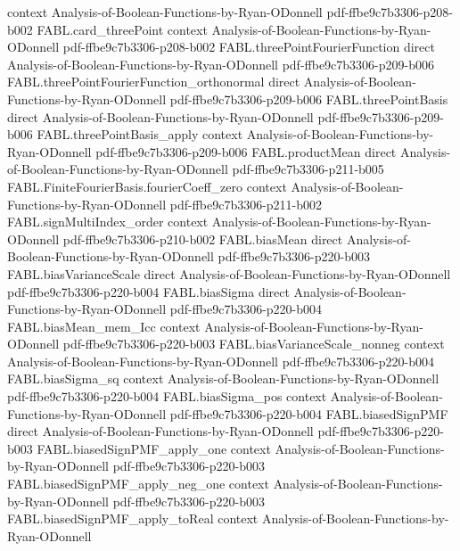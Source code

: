 \begin{theorem}
  {context}
  {Analysis-of-Boolean-Functions-by-Ryan-ODonnell}
  {pdf-ffbe9c7b3306-p208-b002}
\proofstep
  {FABL.card_threePoint}
  {context}
  {Analysis-of-Boolean-Functions-by-Ryan-ODonnell}
  {pdf-ffbe9c7b3306-p208-b002}
\proofstep
  {FABL.threePointFourierFunction}
  {direct}
  {Analysis-of-Boolean-Functions-by-Ryan-ODonnell}
  {pdf-ffbe9c7b3306-p209-b006}
\proofstep
  {FABL.threePointFourierFunction_orthonormal}
  {direct}
  {Analysis-of-Boolean-Functions-by-Ryan-ODonnell}
  {pdf-ffbe9c7b3306-p209-b006}
\proofstep
  {FABL.threePointBasis}
  {direct}
  {Analysis-of-Boolean-Functions-by-Ryan-ODonnell}
  {pdf-ffbe9c7b3306-p209-b006}
\proofstep
  {FABL.threePointBasis_apply}
  {context}
  {Analysis-of-Boolean-Functions-by-Ryan-ODonnell}
  {pdf-ffbe9c7b3306-p209-b006}
\proofstep
  {FABL.productMean}
  {direct}
  {Analysis-of-Boolean-Functions-by-Ryan-ODonnell}
  {pdf-ffbe9c7b3306-p211-b005}
\proofstep
  {FABL.FiniteFourierBasis.fourierCoeff_zero}
  {context}
  {Analysis-of-Boolean-Functions-by-Ryan-ODonnell}
  {pdf-ffbe9c7b3306-p211-b002}
\proofstep
  {FABL.signMultiIndex_order}
  {context}
  {Analysis-of-Boolean-Functions-by-Ryan-ODonnell}
  {pdf-ffbe9c7b3306-p210-b002}
\proofstep
  {FABL.biasMean}
  {direct}
  {Analysis-of-Boolean-Functions-by-Ryan-ODonnell}
  {pdf-ffbe9c7b3306-p220-b003}
\proofstep
  {FABL.biasVarianceScale}
  {direct}
  {Analysis-of-Boolean-Functions-by-Ryan-ODonnell}
  {pdf-ffbe9c7b3306-p220-b004}
\proofstep
  {FABL.biasSigma}
  {direct}
  {Analysis-of-Boolean-Functions-by-Ryan-ODonnell}
  {pdf-ffbe9c7b3306-p220-b004}
\proofstep
  {FABL.biasMean_mem_Icc}
  {context}
  {Analysis-of-Boolean-Functions-by-Ryan-ODonnell}
  {pdf-ffbe9c7b3306-p220-b003}
\proofstep
  {FABL.biasVarianceScale_nonneg}
  {context}
  {Analysis-of-Boolean-Functions-by-Ryan-ODonnell}
  {pdf-ffbe9c7b3306-p220-b004}
\proofstep
  {FABL.biasSigma_sq}
  {context}
  {Analysis-of-Boolean-Functions-by-Ryan-ODonnell}
  {pdf-ffbe9c7b3306-p220-b004}
\proofstep
  {FABL.biasSigma_pos}
  {context}
  {Analysis-of-Boolean-Functions-by-Ryan-ODonnell}
  {pdf-ffbe9c7b3306-p220-b004}
\proofstep
  {FABL.biasedSignPMF}
  {direct}
  {Analysis-of-Boolean-Functions-by-Ryan-ODonnell}
  {pdf-ffbe9c7b3306-p220-b003}
\proofstep
  {FABL.biasedSignPMF_apply_one}
  {context}
  {Analysis-of-Boolean-Functions-by-Ryan-ODonnell}
  {pdf-ffbe9c7b3306-p220-b003}
\proofstep
  {FABL.biasedSignPMF_apply_neg_one}
  {context}
  {Analysis-of-Boolean-Functions-by-Ryan-ODonnell}
  {pdf-ffbe9c7b3306-p220-b003}
\proofstep
  {FABL.biasedSignPMF_apply_toReal}
  {context}
  {Analysis-of-Boolean-Functions-by-Ryan-ODonnell}

\end{theorem}
